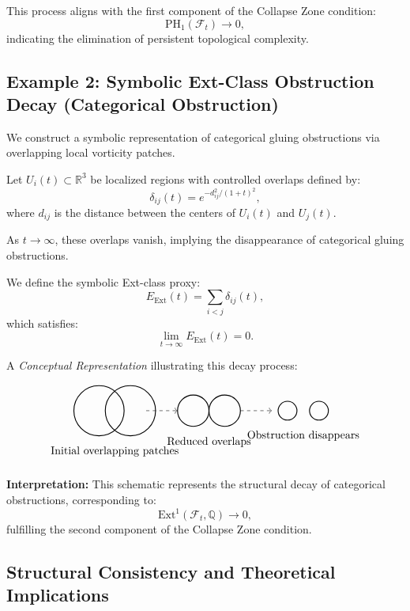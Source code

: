 \documentclass[11pt]{article}
\begin{document}
This process aligns with the first component of the Collapse Zone condition:
\[
\mathrm{PH}_1(\mathcal{F}_t) \to 0,
\]
indicating the elimination of persistent topological complexity.

\subsection{Example 2: Symbolic Ext-Class Obstruction Decay (Categorical Obstruction)}

We construct a symbolic representation of categorical gluing obstructions via overlapping local vorticity patches.

Let \( U_i(t) \subset \mathbb{R}^3 \) be localized regions with controlled overlaps defined by:
\[
\delta_{ij}(t) = e^{-d_{ij}^2/(1 + t)^2},
\]
where \( d_{ij} \) is the distance between the centers of \( U_i(t) \) and \( U_j(t) \).

As \( t \to \infty \), these overlaps vanish, implying the disappearance of categorical gluing obstructions.

We define the symbolic Ext-class proxy:
\[
E_{\mathrm{Ext}}(t) = \sum_{i < j} \delta_{ij}(t),
\]
which satisfies:
\[
\lim_{t \to \infty} E_{\mathrm{Ext}}(t) = 0.
\]

A \emph{Conceptual Representation} illustrating this decay process:

\[
\begin{tikzpicture}
\draw[thick] (0,0) circle (0.8);
\draw[thick] (1,0) circle (0.8);
\node at (0.5, -1.3) {Initial overlapping patches};

\draw[dashed,->] (1.5,0) -- (2.5,0);

\draw[thick] (3,0) circle (0.5);
\draw[thick] (4,0) circle (0.5);
\node at (3.5, -1.0) {Reduced overlaps};

\draw[dashed,->] (4.5,0) -- (5.5,0);

\draw[thick] (6,0) circle (0.3);
\draw[thick] (7,0) circle (0.3);
\node at (6.5, -0.8) {Obstruction disappears};
\end{tikzpicture}
\]

\textbf{Interpretation:}  
This schematic represents the structural decay of categorical obstructions, corresponding to:
\[
\mathrm{Ext}^1(\mathcal{F}_t, \mathbb{Q}) \to 0,
\]
fulfilling the second component of the Collapse Zone condition.

\subsection{Structural Consistency and Theoretical Implications}
\end{document}
